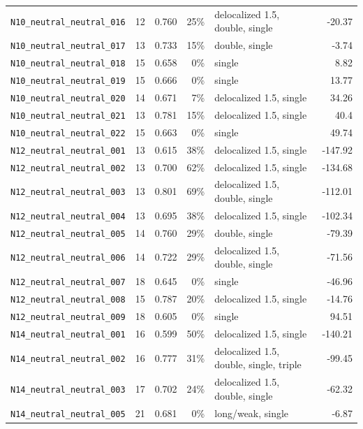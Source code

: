 {\begin{longtable}{@{}p{4.6cm}rrrp{2.4cm}r@{}}
\texttt{N10\_neutral\_neutral\_016} & 12 & 0.760 & 25\% & delocalized 1.5, double, single & -20.37 \\
\texttt{N10\_neutral\_neutral\_017} & 13 & 0.733 & 15\% & double, single & -3.74 \\
\texttt{N10\_neutral\_neutral\_018} & 15 & 0.658 & 0\% & single & 8.82 \\
\texttt{N10\_neutral\_neutral\_019} & 15 & 0.666 & 0\% & single & 13.77 \\
\texttt{N10\_neutral\_neutral\_020} & 14 & 0.671 & 7\% & delocalized 1.5, single & 34.26 \\
\texttt{N10\_neutral\_neutral\_021} & 13 & 0.781 & 15\% & delocalized 1.5, single & 40.4 \\
\texttt{N10\_neutral\_neutral\_022} & 15 & 0.663 & 0\% & single & 49.74 \\
\texttt{N12\_neutral\_neutral\_001} & 13 & 0.615 & 38\% & delocalized 1.5, single & -147.92 \\
\texttt{N12\_neutral\_neutral\_002} & 13 & 0.700 & 62\% & delocalized 1.5, single & -134.68 \\
\texttt{N12\_neutral\_neutral\_003} & 13 & 0.801 & 69\% & delocalized 1.5, double, single & -112.01 \\
\texttt{N12\_neutral\_neutral\_004} & 13 & 0.695 & 38\% & delocalized 1.5, single & -102.34 \\
\texttt{N12\_neutral\_neutral\_005} & 14 & 0.760 & 29\% & double, single & -79.39 \\
\texttt{N12\_neutral\_neutral\_006} & 14 & 0.722 & 29\% & delocalized 1.5, double, single & -71.56 \\
\texttt{N12\_neutral\_neutral\_007} & 18 & 0.645 & 0\% & single & -46.96 \\
\texttt{N12\_neutral\_neutral\_008} & 15 & 0.787 & 20\% & delocalized 1.5, single & -14.76 \\
\texttt{N12\_neutral\_neutral\_009} & 18 & 0.605 & 0\% & single & 94.51 \\
\texttt{N14\_neutral\_neutral\_001} & 16 & 0.599 & 50\% & delocalized 1.5, single & -140.21 \\
\texttt{N14\_neutral\_neutral\_002} & 16 & 0.777 & 31\% & delocalized 1.5, double, single, triple & -99.45 \\
\texttt{N14\_neutral\_neutral\_003} & 17 & 0.702 & 24\% & delocalized 1.5, double, single & -62.32 \\
\texttt{N14\_neutral\_neutral\_005} & 21 & 0.681 & 0\% & long/weak, single & -6.87 \\

\end{longtable}}

